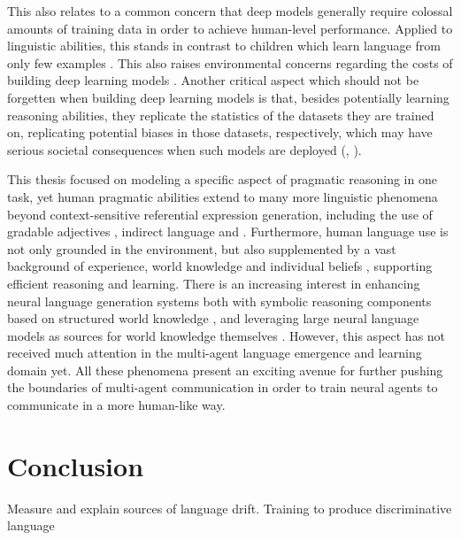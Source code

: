 This also relates to a common concern that deep models generally require colossal amounts of training data in order to achieve human-level performance. Applied to linguistic abilities, this stands in contrast to children which learn language from only few examples \parencite[e.~g.,][]{xu2007word}. This also raises environmental concerns regarding the costs of building deep learning models \parencite{bender2021dangers}.  
Another critical aspect which should not be forgetten when building deep learning models is that, besides potentially learning reasoning abilities, they replicate the statistics of the datasets they are trained on, replicating potential biases in those datasets, respectively, which may have serious societal consequences when such models are deployed (\cite{bender2021dangers}, \cite{buolamwini2018gender}). 

This thesis focused on modeling a specific aspect of pragmatic reasoning in one task, yet human pragmatic abilities extend to many more linguistic phenomena beyond context-sensitive referential expression generation, including the use of gradable adjectives \parencite{qing2014gradable}, indirect language \parencite{yoon2016talking} and .
Furthermore, human language use is not only grounded in the environment, but also supplemented by a vast background of experience, world knowledge and individual beliefs \parencite{lake2017building, franke2016does}, supporting efficient reasoning and learning. There is an increasing interest in enhancing neural language generation systems both with symbolic reasoning components based on structured world knowledge \parencite[e.~g.,][]{nye2021improving}, and leveraging large neural language models as sources for world knowledge themselves \parencite{petroni2019language}. However, this aspect has not received much attention in the multi-agent language emergence and learning domain yet. 
All these phenomena present an exciting avenue for further pushing the boundaries of multi-agent communication in order to train neural agents to communicate in a more human-like way. 

\section{Conclusion}
Measure and explain sources of language drift. Training to produce discriminative language 
